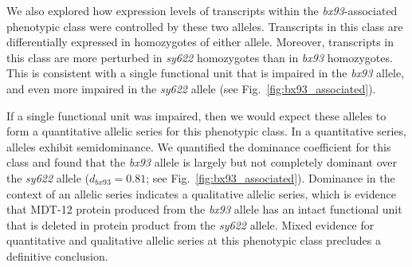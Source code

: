 \documentclass[10pt, twocolumn]{article}
\newcommand{\protein}[1]{\mbox{\uppercase{#1}}}
\begin{document}
We also explored how expression levels of transcripts within the
\emph{bx93}-associated phenotypic class were controlled by these two alleles.
Transcripts in this class are differentially expressed in homozygotes of either
allele. Moreover, transcripts in this class are more perturbed in \emph{sy622}
homozygotes than in \emph{bx93} homozygotes. This is consistent with a single
functional unit that is impaired in the \emph{bx93} allele, and even more
impaired in the \emph{sy622} allele (see Fig.~\ref{fig:bx93_associated}).

If a single functional unit was impaired, then we would expect these alleles to
form a quantitative allelic series for this phenotypic class. In a
quantitative series, alleles exhibit semidominance. We quantified the dominance
coefficient for this class and found that the \emph{bx93} allele is largely but
not completely dominant over the \emph{sy622} allele ($d_{bx93}=0.81$; see
Fig.~\ref{fig:bx93_associated}). Dominance in the context of an allelic series
indicates a qualitative allelic series, which is evidence that \protein{MDT-12}
protein produced from the \emph{bx93} allele has an intact functional unit that
is deleted in protein product from the \emph{sy622} allele. Mixed evidence for
quantitative and qualitative allelic series at this phenotypic class precludes a
definitive conclusion.


%
\end{document}
